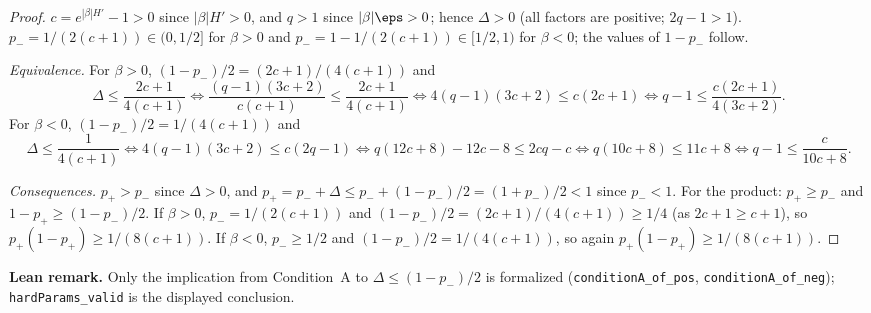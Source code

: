 \begin{proof}
\leanok
{}
$c = e^{|\beta|H'} - 1 > 0$ since $|\beta| H' > 0$, and $q > 1$ since $|\beta|\eps > 0$; hence
$\Delta > 0$ (all factors are positive; $2q - 1 > 1$). $p_- = 1/(2(c+1)) \in (0, 1/2]$ for
$\beta > 0$ and $p_- = 1 - 1/(2(c+1)) \in [1/2, 1)$ for $\beta < 0$; the values of $1 - p_-$ follow.

\emph{Equivalence.} For $\beta > 0$, $(1-p_-)/2 = (2c+1)/(4(c+1))$ and
\[
  \Delta \le \frac{2c+1}{4(c+1)} \iff \frac{(q-1)(3c+2)}{c(c+1)} \le \frac{2c+1}{4(c+1)}
  \iff 4(q-1)(3c+2) \le c(2c+1) \iff q - 1 \le \frac{c(2c+1)}{4(3c+2)} .
\]
For $\beta < 0$, $(1-p_-)/2 = 1/(4(c+1))$ and
\[
  \Delta \le \frac{1}{4(c+1)} \iff 4(q-1)(3c+2) \le c(2q-1) \iff q(12c + 8) - 12c - 8 \le 2cq - c
  \iff q(10c + 8) \le 11c + 8 \iff q - 1 \le \frac{c}{10c+8} .
\]

\emph{Consequences.} $p_+ > p_-$ since $\Delta > 0$, and $p_+ = p_- + \Delta \le p_- + (1-p_-)/2 = (1+p_-)/2 < 1$
since $p_- < 1$. For the product: $p_+ \ge p_-$ and $1 - p_+ \ge (1 - p_-)/2$. If $\beta > 0$,
$p_- = 1/(2(c+1))$ and $(1-p_-)/2 = (2c+1)/(4(c+1)) \ge 1/4$ (as $2c + 1 \ge c + 1$), so
$p_+(1-p_+) \ge 1/(8(c+1))$. If $\beta < 0$, $p_- \ge 1/2$ and $(1-p_-)/2 = 1/(4(c+1))$, so again
$p_+(1-p_+) \ge 1/(8(c+1))$.
\end{proof}

\textbf{Lean remark.} Only the implication from Condition~A to $\Delta \le (1 - p_-)/2$ is formalized
(\texttt{conditionA\_of\_pos}, \texttt{conditionA\_of\_neg}); \texttt{hardParams\_valid} is the displayed
conclusion.

